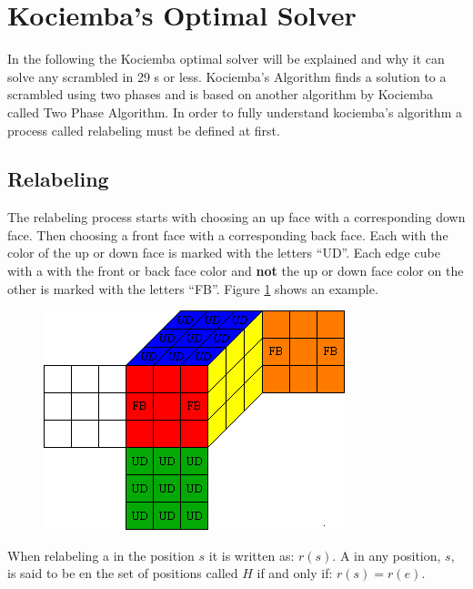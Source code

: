 \section{Kociemba's Optimal Solver}
In the following the Kociemba optimal solver\cite{kociemba09} will be explained and why it can solve any scrambled \rubik{} in 29 \twist{}s or less. Kociemba's Algorithm finds a solution to a scrambled \rubik{} using two phases and is based on another algorithm by Kociemba called Two Phase Algorithm. In order to fully understand kociemba's algorithm a process called relabeling must be  defined at first. 

\subsection{Relabeling}
The relabeling process  starts with choosing an up face with a corresponding down face. Then choosing a front face with a corresponding back face. Each \facelet{} with the color of the up or down face is marked with the letters ``UD''. Each edge cube with a \facelet{} with the front or back face color and \textbf{not} the up or down face color on the other \facelet{} is marked with the letters ``FB''. Figure \ref{fig:relabel1} shows an example.

\begin{figure}[hb]
	\centering
		\includegraphics[scale = 0.8]{input/pics/relabel1}
	\caption{}
	\label{fig:relabel1}
\end{figure}

When relabeling a \rubik{} in the position $s$ it is written as: $r(s)$. A \rubik{} in any position, $s$, is said to be en the set of positions called $H$ if and only if: $r(s)=r(e)$.

